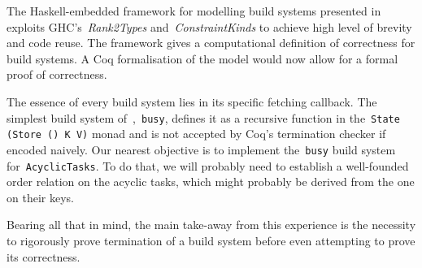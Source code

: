 \documentclass[sigplan,review]{acmart}\settopmatter{printfolios=true,printccs=false,printacmref=false}
\newcommand{\hs}{\texttt}
\begin{document}
The Haskell-embedded framework for modelling build systems presented in~\cite{Mokhov2018icfp} exploits GHC's~\emph{Rank2Types}
and~\emph{ConstraintKinds} to achieve high level of brevity and code reuse.
The framework gives a computational definition of correctness for build systems.
A Coq formalisation of the model would now allow for a formal proof of correctness.

The essence of every build system lies in its specific fetching callback. The
simplest build system of~\cite{Mokhov2018icfp},~\hs{busy}, defines it as a recursive
function in the~\hs{State (Store () K V)} monad and is not accepted by Coq's
termination checker if encoded naively. Our nearest objective is to implement
the~\hs{busy} build system for~\hs{AcyclicTasks}. To do that, we will probably
need to establish a well-founded order relation on the acyclic tasks, which might
probably be derived from the one on their keys.

Bearing all that in mind, the main take-away from this experience is the
necessity to rigorously prove termination of a build system before even
attempting to prove its correctness.


\end{document}
